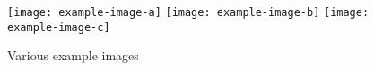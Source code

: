 \documentclass{article}
\begin{document}
\begin{figure}[h]
  {\texttt{[image: example-image-a]}}
  \hspace{\fill}
  {\texttt{[image: example-image-b]}}
  \hspace{\fill}
  {\texttt{[image: example-image-c]}}

  \caption{Various example images}\label{fig:example_images}
\end{figure}
\end{document}
